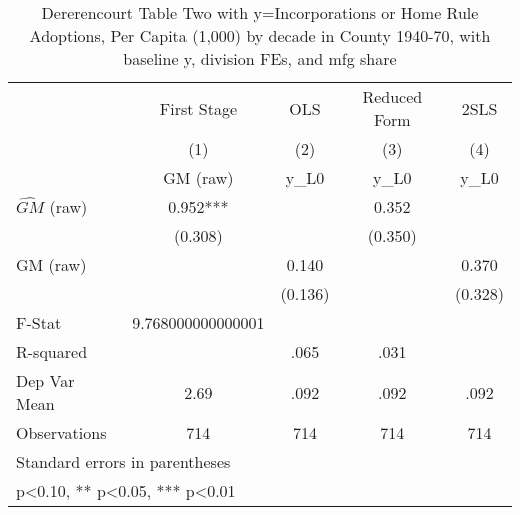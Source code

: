 \begin{table}[htbp]\centering
\def\sym#1{\ifmmode^{#1}\else\(^{#1}\)\fi}
\caption{Dererencourt Table Two with y=Incorporations or Home Rule Adoptions, Per Capita (1,000) by decade in County 1940-70, with baseline y, division FEs, and mfg share}
\begin{tabular}{l*{4}{c}}
\toprule
                    & First Stage   &         OLS   &Reduced Form   &        2SLS   \\
                    &\multicolumn{1}{c}{(1)}&\multicolumn{1}{c}{(2)}&\multicolumn{1}{c}{(3)}&\multicolumn{1}{c}{(4)}\\
                    &\multicolumn{1}{c}{GM  (raw)}&\multicolumn{1}{c}{y\_L0}&\multicolumn{1}{c}{y\_L0}&\multicolumn{1}{c}{y\_L0}\\
\midrule
$\hat{GM}$ (raw)    &       0.952***&               &       0.352   &               \\
                    &     (0.308)   &               &     (0.350)   &               \\
\addlinespace
GM  (raw)           &               &       0.140   &               &       0.370   \\
                    &               &     (0.136)   &               &     (0.328)   \\
\midrule
F-Stat              &9.768000000000001   &               &               &               \\
R-squared           &               &        .065   &        .031   &               \\
Dep Var Mean        &        2.69   &        .092   &        .092   &        .092   \\
Observations        &         714   &         714   &         714   &         714   \\
\bottomrule
\multicolumn{5}{l}{\footnotesize Standard errors in parentheses}\\
\multicolumn{5}{l}{\footnotesize * p<0.10, ** p<0.05, *** p<0.01}\\
\end{tabular}
\end{table}
